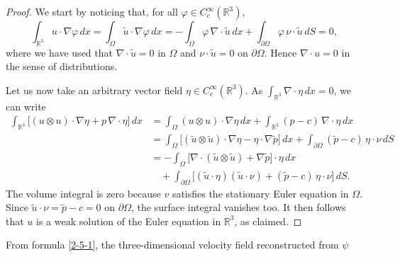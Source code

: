 \documentclass[12pt,reqno]{amsart}
\numberwithin{equation}{section}
\theoremstyle{definition}
\theoremstyle{remark}
\begin{document}
\begin{proof}
	We start by noticing that, for all $\varphi\in C^\infty_c(\mathbb{R}^3)$,
	\[
	\int_{\mathbb{R}^3} u \cdot \nabla \varphi \,dx
	= \int_{\varOmega} \tilde u \cdot \nabla \varphi \,dx
	= -\int_{\varOmega} \varphi\,\nabla\cdot \tilde u \,dx
	+ \int_{\partial\varOmega} \varphi\,\nu\cdot \tilde u \,dS = 0,
	\]
	where we have used that $\nabla\cdot \tilde u = 0$ in $\varOmega$ and $\nu\cdot \tilde u = 0$ on $\partial\varOmega$.
	Hence $\nabla\cdot u = 0$ in the sense of distributions.
	
	Let us now take an arbitrary vector field $\eta\in C^\infty_c(\mathbb{R}^3)$.
	As $\int_{\mathbb{R}^3}\nabla\cdot \eta\, dx = 0$, we can write
	\begin{align*}
	\int_{\mathbb{R}^3} \bigl[ (u\otimes u) \cdot \nabla \eta + p\,\nabla\cdot \eta \bigr] \,dx
	&= \int_{\varOmega} (u\otimes u) \cdot \nabla \eta \,dx
	+ \int_{\mathbb{R}^3} (p-c)\,\nabla\cdot \eta \,dx \\
	&= \int_{\varOmega} \bigl[ (\tilde u\otimes \tilde u) \cdot \nabla \eta - \eta \cdot \nabla \tilde p \bigr] \,dx
	+ \int_{\partial\varOmega} (\tilde p - c)\, \eta \cdot \nu \,dS \\
	&= -\int_{\varOmega} \bigl[ \nabla\cdot(\tilde u\otimes \tilde u) + \nabla \tilde p \bigr] \cdot \eta \,dx \\
	&\quad + \int_{\partial\varOmega} \bigl[ (\tilde u\cdot \eta)(\tilde u\cdot \nu) + (\tilde p - c)\, \eta \cdot \nu \bigr] \,dS .
	\end{align*}
	The volume integral is zero because $v$ satisfies the stationary Euler equation in $\varOmega$.
	Since $\tilde u\cdot \nu = \tilde p - c = 0$ on $\partial\varOmega$, the surface integral vanishes too.
	It then follows that $u$ is a weak solution of the Euler equation in $\mathbb{R}^3$, as claimed.
\end{proof}
From formula \eqref{2-5-1}, the three-dimensional velocity field reconstructed from $\psi$ 
\end{document}
